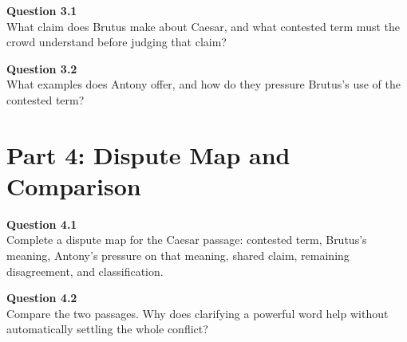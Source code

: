 \documentclass[12pt]{article}
\begin{document}
\textbf{Question 3.1}\\[-0.15em]
What claim does Brutus make about Caesar, and what contested term must the crowd understand before judging that claim?


\textbf{Question 3.2}\\[-0.15em]
What examples does Antony offer, and how do they pressure Brutus's use of the contested term?


\newpage

\section*{Part 4: Dispute Map and Comparison}

\textbf{Question 4.1}\\[-0.15em]
Complete a dispute map for the Caesar passage: contested term, Brutus's meaning, Antony's pressure on that meaning, shared claim, remaining disagreement, and classification.


\textbf{Question 4.2}\\[-0.15em]
Compare the two passages. Why does clarifying a powerful word help without automatically settling the whole conflict?

\end{document}
